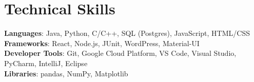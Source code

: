 \documentclass[letterpaper,11pt]{article}
\begin{document}
\section{Technical Skills}
 \begin{itemize}[leftmargin=0.15in, label={}]
    \small{\item{
     \textbf{Languages}{: Java, Python, C/C++, SQL (Postgres), JavaScript, HTML/CSS} \\
     \textbf{Frameworks}{: React, Node.js, JUnit, WordPress, Material-UI} \\
     \textbf{Developer Tools}{: Git, Google Cloud Platform, VS Code, Visual Studio, PyCharm, IntelliJ, Eclipse} \\
     \textbf{Libraries}{: pandas, NumPy, Matplotlib}
    }}
 \end{itemize}

\end{document}
